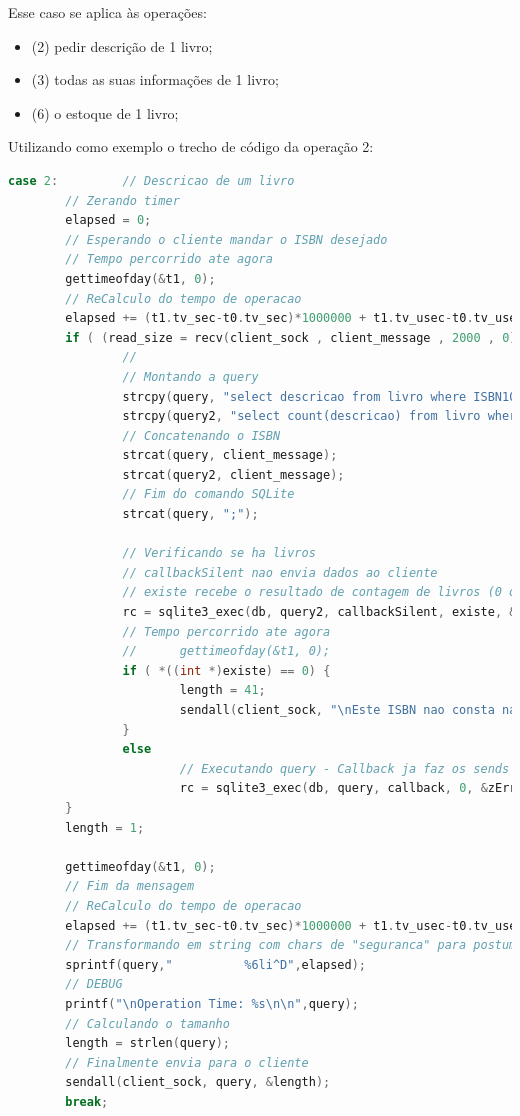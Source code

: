 \documentclass[10pt,a4paper]{report}
\begin{document}
Esse caso se aplica às operações:
\begin{itemize}
\item (2) pedir descrição de 1 livro;
\item (3) todas as suas informações de 1 livro;
\item (6) o estoque de 1 livro;
\end{itemize}
Utilizando como exemplo o trecho de código da operação 2:
\begin{lstlisting}[language=C]
case 2:         // Descricao de um livro
        // Zerando timer
        elapsed = 0;
        // Esperando o cliente mandar o ISBN desejado
        // Tempo percorrido ate agora
        gettimeofday(&t1, 0);
        // ReCalculo do tempo de operacao
        elapsed += (t1.tv_sec-t0.tv_sec)*1000000 + t1.tv_usec-t0.tv_usec;
        if ( (read_size = recv(client_sock , client_message , 2000 , 0)) > 0 ) {
                //                                                      gettimeofday(&t0, 0);
                // Montando a query
                strcpy(query, "select descricao from livro where ISBN10 = ");
                strcpy(query2, "select count(descricao) from livro where ISBN10 = ");
                // Concatenando o ISBN
                strcat(query, client_message);
                strcat(query2, client_message);
                // Fim do comando SQLite
                strcat(query, ";");

                // Verificando se ha livros
                // callbackSilent nao envia dados ao cliente
                // existe recebe o resultado de contagem de livros (0 ou 1)
                rc = sqlite3_exec(db, query2, callbackSilent, existe, &zErrMsg);
                // Tempo percorrido ate agora
                //      gettimeofday(&t1, 0);
                if ( *((int *)existe) == 0) {
                        length = 41;
                        sendall(client_sock, "\nEste ISBN nao consta na nossa livraria!\n",&length);
                }
                else
                        // Executando query - Callback ja faz os sends
                        rc = sqlite3_exec(db, query, callback, 0, &zErrMsg);
        }
        length = 1;
        
        gettimeofday(&t1, 0);
        // Fim da mensagem
        // ReCalculo do tempo de operacao                               
        elapsed += (t1.tv_sec-t0.tv_sec)*1000000 + t1.tv_usec-t0.tv_usec;
        // Transformando em string com chars de "seguranca" para postumo atoi
        sprintf(query,"          %6li^D",elapsed);
        // DEBUG
        printf("\nOperation Time: %s\n\n",query);               
        // Calculando o tamanho
        length = strlen(query);
        // Finalmente envia para o cliente                      
        sendall(client_sock, query, &length);
        break;
\end{lstlisting}
\end{document}
